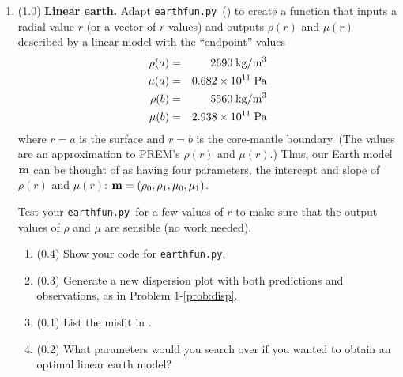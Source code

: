 \documentclass[11pt,titlepage,fleqn]{article}
\newcommand{\tfileD}{{\tt earthfun.py}}
\begin{document}
\begin{enumerate}
\label{prob:earth_homo}


\item (1.0) {\bf Linear earth.} Adapt \tfileD\ () to create a function that inputs a radial value $r$ (or a vector of $r$ values) and outputs $\rho(r)$ and $\mu(r)$ described by a linear model with the ``endpoint'' values
%
\begin{eqnarray*}
\rho(a) &=& 2690 \; {\rm kg/m^3}
\\
\mu(a) &=& 0.682 \times 10^{11} \; {\rm Pa}
\\
\rho(b) &=& 5560 \; {\rm kg/m^3}
\\
\mu(b) &=& 2.938 \times 10^{11} \; {\rm Pa}
\end{eqnarray*}
%
where $r=a$ is the surface and $r=b$ is the core-mantle boundary. (The values are an approximation to PREM's $\rho(r)$ and $\mu(r)$.) Thus, our Earth model $\mbox{${\bf m}$}$ can be thought of as having four parameters, the intercept and slope of $\rho(r)$ and $\mu(r)$: $\mbox{${\bf m}$} = (\rho_0,\rho_1,\mu_0,\mu_1)$.

Test your \tfileD\ for a few values of $r$ to make sure that the output values of $\rho$ and $\mu$ are sensible (no work needed).


\begin{enumerate}
\item (0.4) Show your code for \tfileD.
\item (0.3) Generate a new dispersion plot with both predictions and observations, as in Problem 1-\ref{prob:disp}.
\item (0.1) List the misfit in .
\item (0.2) What parameters would you search over if you wanted to obtain an optimal linear earth model?
\end{enumerate}

\label{prob:earth_linear}



\end{enumerate}
\end{document}
